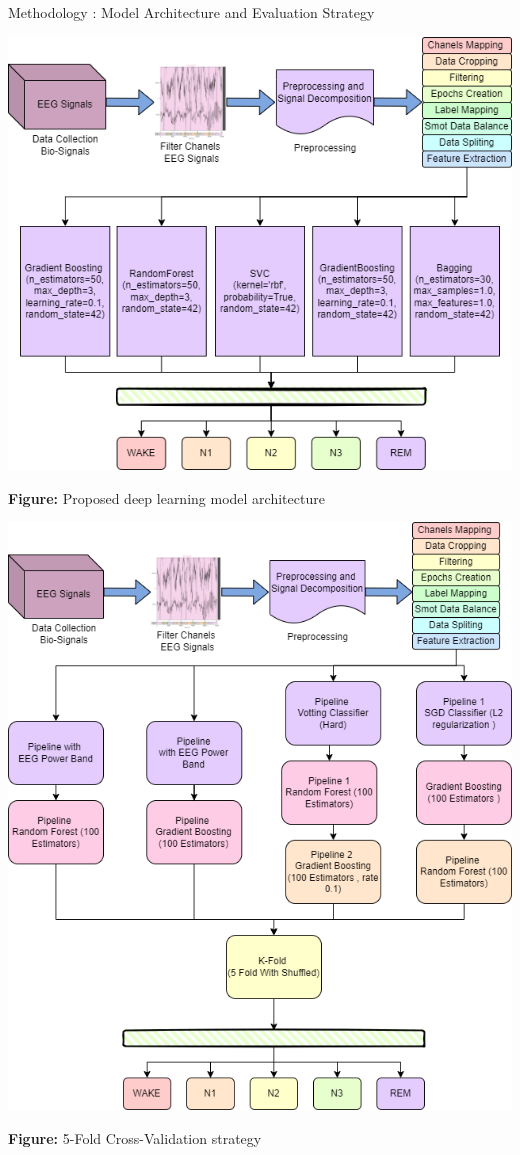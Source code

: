 \begin{frame}{Methodology : Model Architecture and Evaluation Strategy}
	\centering
	\begin{minipage}{0.45\linewidth}
		\centering
		\includegraphics[width=\linewidth]{images/paper_1/ARchitechture}
		
		\vspace{0.5em}
		\small{\textbf{Figure:} Proposed deep learning model architecture}
	\end{minipage}
	\hfill
	\begin{minipage}{0.35\linewidth}
		\centering
		\includegraphics[width=\linewidth]{images/paper_1/K-Fold}
		
		\vspace{0.5em}
		\small{\textbf{Figure:} 5-Fold Cross-Validation strategy}
	\end{minipage}
\end{frame}
